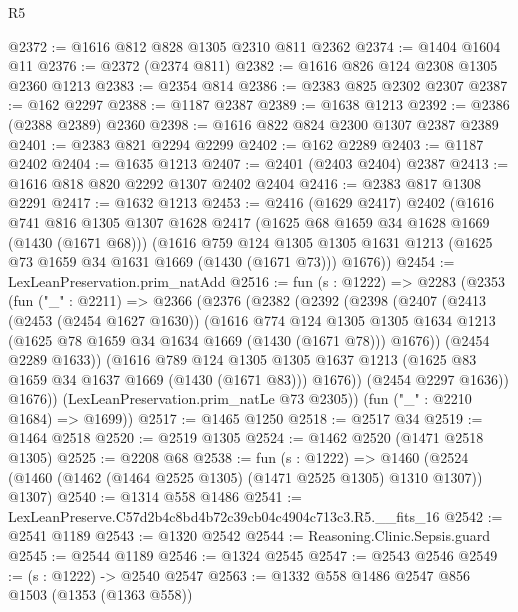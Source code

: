 \begin{lexlean}{R5}
\begin{coremodule}
@2372 := @1616 @812 @828 @1305 @2310 @811 @2362
@2374 := @1404 @1604 @11
@2376 := @2372 (@2374 @811)
@2382 := @1616 @826 @124 @2308 @1305 @2360 @1213
@2383 := @2354 @814
@2386 := @2383 @825 @2302 @2307
@2387 := @162 @2297
@2388 := @1187 @2387
@2389 := @1638 @1213
@2392 := @2386 (@2388 @2389) @2360
@2398 := @1616 @822 @824 @2300 @1307 @2387 @2389
@2401 := @2383 @821 @2294 @2299
@2402 := @162 @2289
@2403 := @1187 @2402
@2404 := @1635 @1213
@2407 := @2401 (@2403 @2404) @2387
@2413 := @1616 @818 @820 @2292 @1307 @2402 @2404
@2416 := @2383 @817 @1308 @2291
@2417 := @1632 @1213
@2453 := @2416
    (@1629 @2417)
    @2402
    (@1616
      @741
      @816
      @1305
      @1307
      @1628
      @2417
      (@1625 @68 @1659 @34 @1628 @1669 (@1430 (@1671 @68)))
      (@1616
        @759
        @124
        @1305
        @1305
        @1631
        @1213
        (@1625 @73 @1659 @34 @1631 @1669 (@1430 (@1671 @73)))
        @1676))
@2454 := LexLeanPreservation.prim_natAdd
@2516 := fun (s : @1222) =>
  @2283
    (@2353
      (fun ("_" : @2211) =>
      @2366
        (@2376
          (@2382
            (@2392
              (@2398
                (@2407
                  (@2413
                    (@2453 (@2454 @1627 @1630))
                    (@1616
                      @774
                      @124
                      @1305
                      @1305
                      @1634
                      @1213
                      (@1625 @78 @1659 @34 @1634 @1669 (@1430 (@1671 @78)))
                      @1676))
                  (@2454 @2289 @1633))
                (@1616
                  @789
                  @124
                  @1305
                  @1305
                  @1637
                  @1213
                  (@1625 @83 @1659 @34 @1637 @1669 (@1430 (@1671 @83)))
                  @1676))
              (@2454 @2297 @1636))
            @1676))
        (LexLeanPreservation.prim_natLe @73 @2305))
      (fun ("_" : @2210 @1684) => @1699))
@2517 := @1465 @1250
@2518 := @2517 @34
@2519 := @1464 @2518
@2520 := @2519 @1305
@2524 := @1462 @2520 (@1471 @2518 @1305)
@2525 := @2208 @68
@2538 := fun (s : @1222) =>
  @1460 (@2524 (@1460 (@1462 (@1464 @2525 @1305) (@1471 @2525 @1305) @1310 @1307)) @1307)
@2540 := @1314 @558 @1486
@2541 := LexLeanPreserve.C57d2b4c8bd4b72c39cb04c4904c713c3.R5.__fits_16
@2542 := @2541 @1189
@2543 := @1320 @2542
@2544 := Reasoning.Clinic.Sepsis.guard
@2545 := @2544 @1189
@2546 := @1324 @2545
@2547 := @2543 @2546
@2549 := (s : @1222) -> @2540 @2547
@2563 := @1332
    @558
    @1486
    @2547
    @856
    @1503
    (@1353 (@1363 @558))

\end{coremodule}
\end{lexlean}
